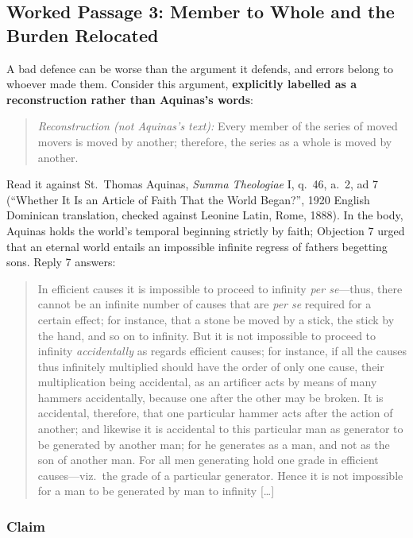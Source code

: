 \subsection{Worked Passage 3: Member to Whole and the Burden Relocated}

A bad defence can be worse than the argument it defends, and errors belong to whoever made them. Consider this argument, \textbf{explicitly labelled as a reconstruction rather than Aquinas's words}:

\begin{quote}
\emph{Reconstruction (not Aquinas's text):} Every member of the series of moved movers is moved by another; therefore, the series as a whole is moved by another.
\end{quote}

Read it against St.\ Thomas Aquinas, \emph{Summa Theologiae} I, q.\ 46, a.\ 2, ad 7 (``Whether It Is an Article of Faith That the World Began?'', 1920 English Dominican translation, checked against Leonine Latin, Rome, 1888). In the body, Aquinas holds the world's temporal beginning strictly by faith; Objection 7 urged that an eternal world entails an impossible infinite regress of fathers begetting sons. Reply 7 answers:

\begin{quote}
In efficient causes it is impossible to proceed to infinity \emph{per se}---thus, there cannot be an infinite number of causes that are \emph{per se} required for a certain effect; for instance, that a stone be moved by a stick, the stick by the hand, and so on to infinity. But it is not impossible to proceed to infinity \emph{accidentally} as regards efficient causes; for instance, if all the causes thus infinitely multiplied should have the order of only one cause, their multiplication being accidental, as an artificer acts by means of many hammers accidentally, because one after the other may be broken. It is accidental, therefore, that one particular hammer acts after the action of another; and likewise it is accidental to this particular man as generator to be generated by another man; for he generates as a man, and not as the son of another man. For all men generating hold one grade in efficient causes---viz.\ the grade of a particular generator. Hence it is not impossible for a man to be generated by man to infinity [\dots]
\end{quote}

\subsubsection*{Claim}

